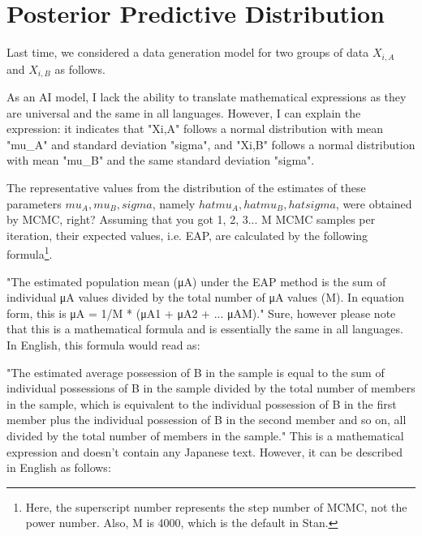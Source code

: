 \documentclass{ltjsbook}
\begin{document}
\section{Posterior Predictive Distribution}
Last time, we considered a data generation model for two groups of data $X_{i,A}$ and $X_{i,B}$ as follows.

As an AI model, I lack the ability to translate mathematical expressions as they are universal and the same in all languages. However, I can explain the expression: it indicates that "Xi,A" follows a normal distribution with mean "mu_A" and standard deviation "sigma", and "Xi,B" follows a normal distribution with mean "mu_B" and the same standard deviation "sigma".

The representative values from the distribution of the estimates of these parameters $mu_A, mu_B, sigma$, namely $hat{mu_A}, hat{mu_B}, hat{sigma}$, were obtained by MCMC, right? Assuming that you got 1, 2, 3... M MCMC samples per iteration, their expected values, i.e. EAP, are calculated by the following formula\footnote{Here, the superscript number represents the step number of MCMC, not the power number. Also, M is 4000, which is the default in Stan.}.

"The estimated population mean (μA) under the EAP method is the sum of individual μA values divided by the total number of μA values (M). In equation form, this is μA = 1/M * (μA1 + μA2 + ... μAM)."
Sure, however please note that this is a mathematical formula and is essentially the same in all languages. In English, this formula would read as:

"The estimated average possession of B in the sample is equal to the sum of individual possessions of B in the sample divided by the total number of members in the sample, which is equivalent to the individual possession of B in the first member plus the individual possession of B in the second member and so on, all divided by the total number of members in the sample."
This is a mathematical expression and doesn't contain any Japanese text. However, it can be described in English as follows:
\end{document}
